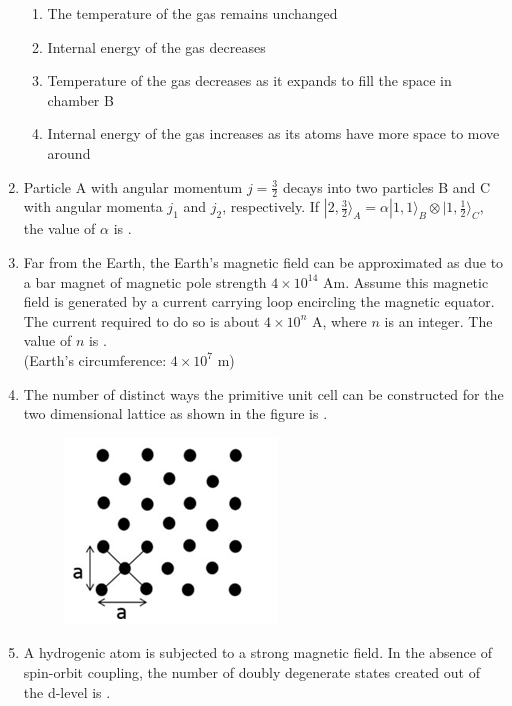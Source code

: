 \documentclass[journal,12pt,onecolumn]{IEEEtran}
\theoremstyle{remark}
\begin{document}
\begin{enumerate}
    \begin{enumerate}
        \item The temperature of the gas remains unchanged
        \item Internal energy of the gas decreases
        \item Temperature of the gas decreases as it expands to fill the space in chamber B
        \item Internal energy of the gas increases as its atoms have more space to move around
    \end{enumerate}
    
    
    \item Particle A with angular momentum $j = \frac{3}{2}$ decays into two particles B and C with angular momenta $j_1$ and $j_2$, respectively. If $|2, \frac{3}{2}\rangle_A = \alpha |1,1\rangle_B \otimes |1, \frac{1}{2}\rangle_C$, the value of $\alpha$ is \underline{\hspace{2cm}}.

    \item Far from the Earth, the Earth's magnetic field can be approximated as due to a bar magnet of magnetic pole strength $4 \times 10^{14}$ Am. Assume this magnetic field is generated by a current carrying loop encircling the magnetic equator. The current required to do so is about $4 \times 10^n$ A, where $n$ is an integer. The value of $n$ is \underline{\hspace{2cm}}.\\
    (Earth's circumference: $4 \times 10^7$ m)

    \item The number of distinct ways the primitive unit cell can be constructed for the two dimensional lattice as shown in the figure is \underline{\hspace{2cm}}.
    \begin{figure}[H]
    \centering
    \includegraphics[width=0.25\columnwidth]{fig/Q19.png}
     \caption*{}
    \label{fig:Q19}
\end{figure}
   

    \item A hydrogenic atom is subjected to a strong magnetic field. In the absence of spin-orbit coupling, the number of doubly degenerate states created out of the d-level is \underline{\hspace{2cm}}.


\end{enumerate}
\end{document}
